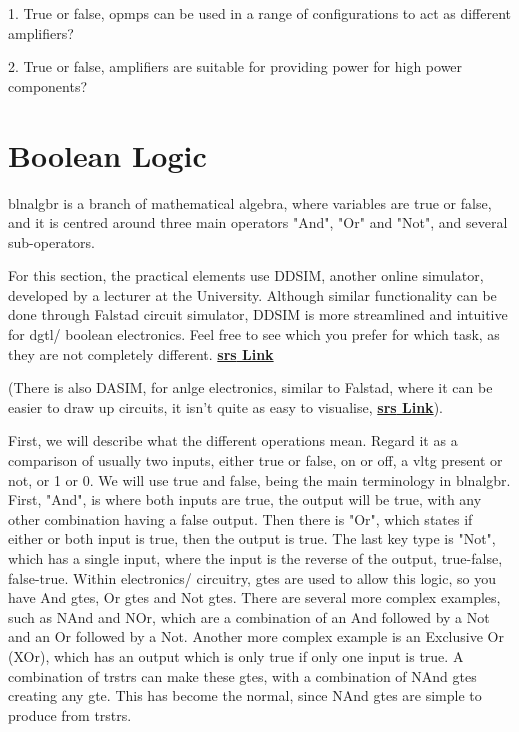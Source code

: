 \documentclass[a4paper,11pt]{report}
\newcommand{\Quiz}[1] %
{
\par\noindent %
\phantomsection %
\todo[inline, color=blue!30]{\textbf{#1}} %
\vspace{1em} %
}
\let\oldhref\href %
\renewcommand{\href}[2]{\oldhref{#1}{\bf\gls{srs} #2}}
\begin{document}
\Quiz{Quiz}

1. True or false, \gls{opmp}s can be used in a range of configurations to act as different amplifiers?

2. True or false, amplifiers are suitable for providing power for high power components?

\pagebreak

\section{Boolean Logic}

\gls{blnalgbr} is a branch of mathematical algebra, where variables are true or false, and it is centred around three main operators "And", "Or" and "Not", and several sub-operators.

For this section, the practical elements use DDSIM, another online simulator, developed by a lecturer at the University. Although similar functionality can be done through Falstad circuit simulator, DDSIM is more streamlined and intuitive for \gls{dgtl}/ boolean electronics. Feel free to see which you prefer for which task, as they are not completely different.
\href{https://www-users.york.ac.uk/~dajp1/Temp/ddsim.html}{Link}

(There is also DASIM, for \gls{anlge} electronics, similar to Falstad, where it can be easier to draw up circuits, it isn't quite as easy to visualise, \href{https://www-users.york.ac.uk/~dajp1/Temp/dasim.html}{Link}).

First, we will describe what the different operations mean. Regard it as a comparison of usually two inputs, either true or false, on or off, a \gls{vltg} present or not, or 1 or 0. We will use true and false, being the main terminology in \gls{blnalgbr}. First, "And", is where both inputs are true, the output will be true, with any other combination having a false output. Then there is "Or", which states if either or both input is true, then the output is true. The last key type is "Not", which has a single input, where the input is the reverse of the output, true-false, false-true. Within electronics/ circuitry, \gls{gte}s are used to allow this logic, so you have And \gls{gte}s, Or \gls{gte}s and Not \gls{gte}s. There are several more complex examples, such as NAnd and NOr, which are a combination of an And followed by a Not and an Or followed by a Not. Another more complex example is an Exclusive Or (XOr), which has an output which is only true if only one input is true. A combination of \gls{trstr}s can make these \gls{gte}s, with a combination of NAnd \gls{gte}s creating any \gls{gte}. This has become the normal, since NAnd \gls{gte}s are simple to produce from \gls{trstr}s.
\end{document}
